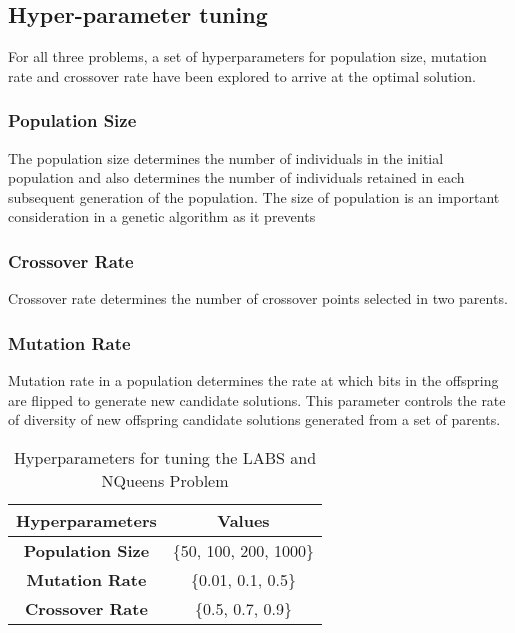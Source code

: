 \documentclass{article}
\begin{document}
\subsection{Hyper-parameter tuning}
For all three problems, a set of hyperparameters for population size, mutation rate and crossover rate have been explored to arrive at the optimal solution.

\subsubsection{Population Size}
The population size determines the number of individuals in the initial population and also determines the number of individuals retained in each subsequent generation of the population. The size of population is an important consideration in a genetic algorithm as it prevents 

\subsubsection{Crossover Rate}
Crossover rate determines the number of crossover points selected in two parents.

\subsubsection{Mutation Rate}
Mutation rate in a population determines the rate at which bits in the offspring are flipped to generate new candidate solutions. This parameter controls the rate of diversity of new offspring candidate solutions generated from a set of parents.  
\begin{table}[h!]
    \centering
    \begin{tabular}{|c|c|} \hline 
        \textbf{Hyperparameters} & \textbf{Values}  \\ \hline
        \textbf{Population Size} & \{50, 100, 200, 1000\}  \\ \hline
        \textbf{Mutation Rate}   & \{0.01, 0.1, 0.5\} \\ \hline  
        \textbf{Crossover Rate}  & \{0.5, 0.7, 0.9\} \\ \hline
    \end{tabular}
    \caption{Hyperparameters for tuning the LABS and NQueens Problem}
    \label{tab:hyperparameter-tuning}
\end{table}


\end{document}
